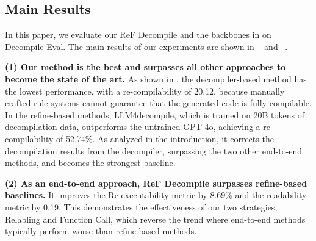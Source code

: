 \subsection{Main Results}


In this paper, we evaluate our ReF Decompile and the backbones in  on Decompile-Eval. The main results of our experiments are shown in ~ and ~. 





\textbf{(1) Our method is the best and surpasses all other approaches to become the state of the art.} As shown in , the decompiler-based method has the lowest performance, with a re-compilability of 20.12, because manually crafted rule systems cannot guarantee that the generated code is fully compilable. In the refine-based methods, LLM4decompile, which is trained on 20B tokens of decompilation data, outperforms the untrained GPT-4o, achieving a re-compilability of 52.74\%. As analyzed in the introduction, it corrects the decompilation results from the decompiler, surpassing the two other end-to-end methods, and becomes the strongest baseline.

\textbf{(2) As an end-to-end approach, ReF Decompile surpasses refine-based baselines.} It improves the Re-executability metric by 8.69\% and the readability metric by 0.19. This demonstrates the effectiveness of our two strategies, Relabling and Function Call, which reverse the trend where end-to-end methods typically perform worse than refine-based methods.


